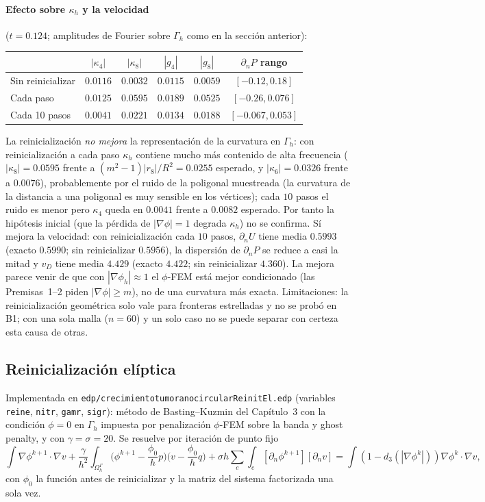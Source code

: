 \paragraph{Efecto sobre $\kappa_h$ y la velocidad} ($t=0.124$; amplitudes de Fourier sobre $\Gamma_h$ como en la sección anterior):
\begin{center}
\begin{tabular}{lccccc}
\toprule
 & $|\kappa_4|$ & $|\kappa_8|$ & $|g_4|$ & $|g_8|$ & $\partial_nP$ rango\\
\midrule
Sin reinicializar & $0.0116$ & $0.0032$ & $0.0115$ & $0.0059$ & $[-0.12,0.18]$\\
Cada paso & $0.0125$ & $0.0595$ & $0.0189$ & $0.0525$ & $[-0.26,0.076]$\\
Cada 10 pasos & $0.0041$ & $0.0221$ & $0.0134$ & $0.0188$ & $[-0.067,0.053]$\\
\bottomrule
\end{tabular}
\end{center}
La reinicialización \emph{no mejora} la representación de la curvatura en $\Gamma_h$: con reinicialización a cada paso $\kappa_h$ contiene mucho más contenido de alta frecuencia ($|\kappa_8|=0.0595$ frente a $(m^2-1)|r_8|/R^2=0.0255$ esperado, y $|\kappa_6|=0.0326$ frente a $0.0076$), probablemente por el ruido de la poligonal muestreada (la curvatura de la distancia a una poligonal es muy sensible en los vértices); cada $10$ pasos el ruido es menor pero $\kappa_4$ queda en $0.0041$ frente a $0.0082$ esperado. Por tanto la hipótesis inicial (que la pérdida de $|\nabla\phi|=1$ degrada $\kappa_h$) no se confirma. Sí mejora la velocidad: con reinicialización cada $10$ pasos, $\partial_nU$ tiene media $0.5993$ (exacto $0.5990$; sin reinicializar $0.5956$), la dispersión de $\partial_nP$ se reduce a casi la mitad y $v_D$ tiene media $4.429$ (exacto $4.422$; sin reinicializar $4.360$). La mejora parece venir de que con $|\nabla\phi_h|\approx1$ el $\phi$-FEM está mejor condicionado (las Premisas~1--2 piden $|\nabla\phi|\ge m$), no de una curvatura más exacta. Limitaciones: la reinicialización geométrica solo vale para fronteras estrelladas y no se probó en B1; con una sola malla ($n=60$) y un solo caso no se puede separar con certeza esta causa de otras.

\subsection{Reinicialización elíptica}

Implementada en \texttt{edp/crecimientotumoranocircularReinitEl.edp} (variables \texttt{reine}, \texttt{nitr}, \texttt{gamr}, \texttt{sigr}): método de Basting--Kuzmin del Capítulo~3 con la condición $\phi=0$ en $\Gamma_h$ impuesta por penalización $\phi$-FEM sobre la banda y ghost penalty, y con $\gamma=\sigma=20$. Se resuelve por iteración de punto fijo
\[
\int\nabla\phi^{k+1}\cdot\nabla v+\frac{\gamma}{h^2}\int_{\Omega_h^\Gamma}\!\Big(\phi^{k+1}-\frac{\phi_0}{h}p\Big)\Big(v-\frac{\phi_0}{h}q\Big)+\sigma h\sum_e\int_e[\partial_n\phi^{k+1}][\partial_nv]=\int(1-d_3(|\nabla\phi^k|))\nabla\phi^k\cdot\nabla v,
\]
con $\phi_0$ la función antes de reinicializar y la matriz del sistema factorizada una sola vez.

